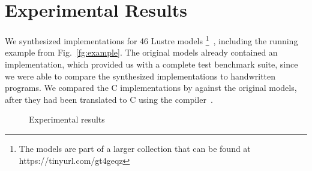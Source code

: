 \section{Experimental Results}
\label{sec:experiment}

We synthesized implementations for 46 Lustre models%
\footnote{The models are part of a larger collection
that can be found at
https://tinyurl.com/gt4geqz}~\cite{Hagen08:FMCAD}, including the running example from Fig.~\ref{fg:example}.
 The original models already contained an implementation,
which provided us with a complete test benchmark suite, since we were able to
compare the synthesized implementations to handwritten programs.
We compared the C implementations by \jkindsynt against the original models, after they had been translated
to C using the \lustrev compiler~\cite{lustrev6}.


\begin{figure}[h!]
	\centering
	\hspace{5mm}
	\hfill
	\caption{Experimental results}
	\label{fig:expfigs} 
\end{figure}

